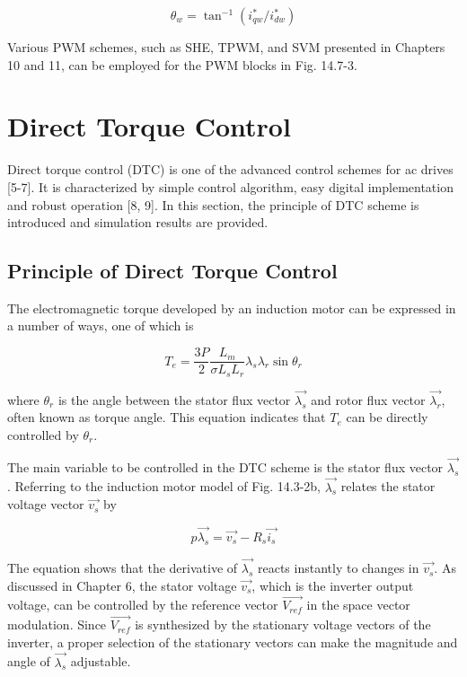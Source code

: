 \documentclass[letterpaper,12pt]{article}
\begin{document}
\begin{equation}
\theta_w = \tan^{-1} (i_{qw}^* / i_{dw}^*) \tag{14.7-9}
\end{equation}

Various PWM schemes, such as SHE, TPWM, and SVM presented in Chapters 10 and 11, can be employed for the PWM blocks in Fig. 14.7-3.

\section{Direct Torque Control}
Direct torque control (DTC) is one of the advanced control schemes for ac drives [5-7]. It is characterized by simple control algorithm, easy digital implementation and robust operation [8, 9]. In this section, the principle of DTC scheme is introduced and simulation results are provided.

\subsection{Principle of Direct Torque Control}
The electromagnetic torque developed by an induction motor can be expressed in a number of ways, one of which is

\begin{equation}
T_e = \frac{3P}{2} \frac{L_m}{\sigma L_s L_r} \lambda_s \lambda_r \sin \theta_r \tag{14.8-1}
\end{equation}

where $\theta_r$ is the angle between the stator flux vector $\vec{\lambda_s}$ and rotor flux vector $\vec{\lambda_r}$, often known as torque angle. This equation indicates that $T_e$ can be directly controlled by $\theta_r$.

The main variable to be controlled in the DTC scheme is the stator flux vector $\vec{\lambda_s}$. Referring to the induction motor model of Fig. 14.3-2b, $\vec{\lambda_s}$ relates the stator voltage vector $\vec{v_s}$ by

\begin{equation}
p \vec{\lambda_s} = \vec{v_s} - R_s \vec{i_s} \tag{14.8-2}
\end{equation}

The equation shows that the derivative of $\vec{\lambda_s}$ reacts instantly to changes in $\vec{v_s}$. As discussed in Chapter 6, the stator voltage $\vec{v_s}$, which is the inverter output voltage, can be controlled by the reference vector $\vec{V_{ref}}$ in the space vector modulation. Since $\vec{V_{ref}}$ is synthesized by the stationary voltage vectors of the inverter, a proper selection of the stationary vectors can make the magnitude and angle of $\vec{\lambda_s}$ adjustable.
\end{document}
